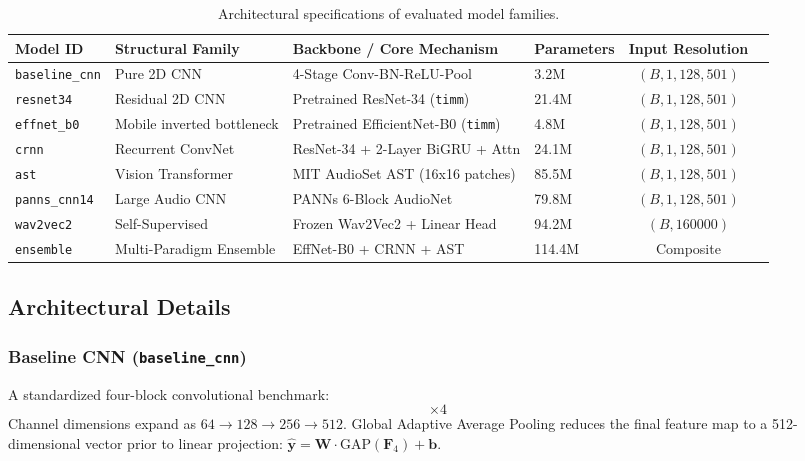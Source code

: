\documentclass[11pt,a4paper]{article}
\begin{document}
\begin{table}[H]
\centering
\small
\setlength{\tabcolsep}{4.5pt}
\caption{Architectural specifications of evaluated model families.}
\label{tab:models}
\begin{tabularx}{\textwidth}{llllcc}
\toprule
\textbf{Model ID} & \textbf{Structural Family} & \textbf{Backbone / Core Mechanism} & \textbf{Parameters} & \textbf{Input Resolution} \\
\midrule
\texttt{baseline\_cnn} & Pure 2D CNN & 4-Stage Conv-BN-ReLU-Pool & 3.2M & $(B, 1, 128, 501)$ \\
\texttt{resnet34} & Residual 2D CNN & Pretrained ResNet-34 (\texttt{timm}) & 21.4M & $(B, 1, 128, 501)$ \\
\texttt{effnet\_b0} & Mobile inverted bottleneck & Pretrained EfficientNet-B0 (\texttt{timm}) & 4.8M & $(B, 1, 128, 501)$ \\
\texttt{crnn} & Recurrent ConvNet & ResNet-34 + 2-Layer BiGRU + Attn & 24.1M & $(B, 1, 128, 501)$ \\
\texttt{ast} & Vision Transformer & MIT AudioSet AST (16x16 patches) & 85.5M & $(B, 1, 128, 501)$ \\
\texttt{panns\_cnn14} & Large Audio CNN & PANNs 6-Block AudioNet & 79.8M & $(B, 1, 128, 501)$ \\
\texttt{wav2vec2} & Self-Supervised & Frozen Wav2Vec2 + Linear Head & 94.2M & $(B, 160000)$ \\
\texttt{ensemble} & Multi-Paradigm Ensemble & EffNet-B0 + CRNN + AST & 114.4M & Composite \\
\bottomrule
\end{tabularx}
\end{table}

\subsection{Architectural Details}

\subsubsection{Baseline CNN (\texttt{baseline\_cnn})}
A standardized four-block convolutional benchmark:
\begin{equation}
    [\text{Conv}3\times3 \to \text{BatchNorm} \to \text{ReLU} \to \text{Conv}3\times3 \to \text{BatchNorm} \to \text{ReLU} \to \text{AvgPool}2\times2] \times 4
\end{equation}
Channel dimensions expand as $64 \to 128 \to 256 \to 512$. Global Adaptive Average Pooling reduces the final feature map to a 512-dimensional vector prior to linear projection: $\hat{\mathbf{y}} = \mathbf{W} \cdot \text{GAP}(\mathbf{F}_4) + \mathbf{b}$.
\end{document}

